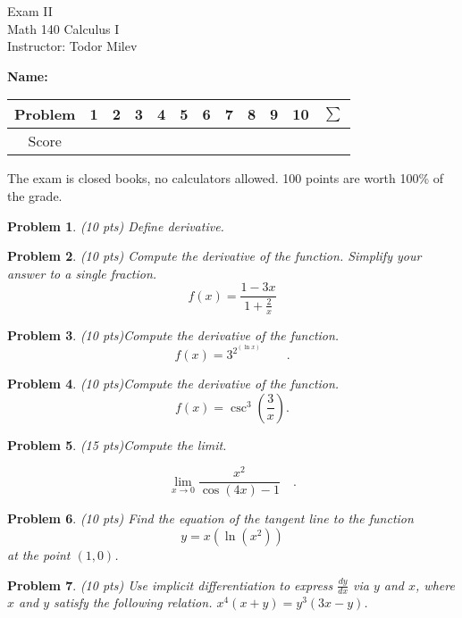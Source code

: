 \documentclass{article}
\newtheorem{problem}{Problem}
\begin{document}
\begin{center}
\Large
Exam II\\ Math 140 Calculus I \\ \normalsize Instructor: Todor Milev
\end{center}

\noindent \textbf{Name:} \hfill{~}
\begin{tabular}{c|c|c|c|c|c|c|c|c|c|c||c}
Problem&1 &2&3&4&5&6&7&8&9&10& $\sum$\\\hline
Score&&&&&&&&&&&
\end{tabular} 

\noindent The exam is closed books, no calculators allowed. 100 points are worth 100\% of the grade. 
\begin{problem}(10 pts) Define derivative.
\end{problem}

\vskip 8cm

\begin{problem}(10 pts)
Compute the derivative of the function. Simplify your answer to a single fraction.
\[f(x)=\frac{1-3x }{1+\frac{2}x}
\]
\end{problem}
\newpage
\begin{problem}(10 pts)Compute the derivative of the function.
\[
f(x)=3^{2^{(\ln x)}}\quad \quad.
\]
\end{problem}
\vskip 9cm

\begin{problem}(10 pts)Compute the derivative of the function.
\[f(x)= \csc^3 \left(\frac{3}{x}\right).
\]
\end{problem}

\newpage

\begin{problem}(15 pts)Compute the limit.

\[\lim\limits_{x\to 0} 
\frac{x^2}{\cos(4x) -1} \quad .
\] 

\end{problem}
\vskip 9cm


\begin{problem}(10 pts)
Find the equation of the tangent line to the function 
\[
y=x(\ln (x^2)) 
\] 
at the point $(1, 0)$. 
\end{problem}

\newpage

\begin{problem}(10 pts)
Use implicit differentiation to express $\frac{dy}{dx}$ via $y $ and $x$, where $x$ and $y$ satisfy the following relation.
$x^4(x+y)=y^3(3x-y)$.
\end{problem}
\vskip 9cm
\end{document}
